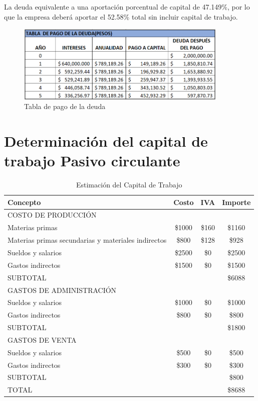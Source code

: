 La deuda equivalente a una aportación porcentual de capital de 47.149\%, por lo que la empresa deberá aportar el 52.58\% total sin incluir capital de trabajo. 

\begin{figure}[H]
    \centering	
    \includegraphics[width=0.9\textwidth]{chapters/ELC_11.png} 
    \caption{Tabla de pago de la deuda}
\label{fig:croquis190125}
\end{figure}


\section{Determinación del capital de trabajo Pasivo circulante}

\begin{table}[htbp]
    \centering
    \begin{tabular}{|l|c|c|c|}
        \hline
        \textbf{Concepto} & \textbf{Costo} & \textbf{IVA} & \textbf{Importe} \\
        \hline
        COSTO DE PRODUCCIÓN & & & \\
        \hline
        Materias primas & \$1000 & \$160 & \$1160 \\
        Materias primas secundarias y materiales indirectos & \$800 & \$128 & \$928 \\
        Sueldos y salarios & \$2500 & \$0 & \$2500 \\
        Gastos indirectos & \$1500 & \$0 & \$1500 \\
        \hline
        SUBTOTAL & & & \$6088 \\
        \hline
        GASTOS DE ADMINISTRACIÓN & & & \\
        \hline
        Sueldos y salarios & \$1000 & \$0 & \$1000 \\
        Gastos indirectos & \$800 & \$0 & \$800 \\
        \hline
        SUBTOTAL & & & \$1800 \\
        \hline
        GASTOS DE VENTA & & & \\
        \hline
        Sueldos y salarios & \$500 & \$0 & \$500 \\
        Gastos indirectos & \$300 & \$0 & \$300 \\
        \hline
        SUBTOTAL & & & \$800 \\
        \hline
        TOTAL & & & \$8688 \\
        \hline
    \end{tabular}
    \caption{Estimación del Capital de Trabajo}
    \label{tab:estimacion_capital_trabajo}
\end{table}


